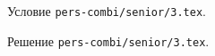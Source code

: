 \problem
Условие \texttt{pers-combi/senior/3.tex}.

\solution Решение \texttt{pers-combi/senior/3.tex}.
\endproblem
